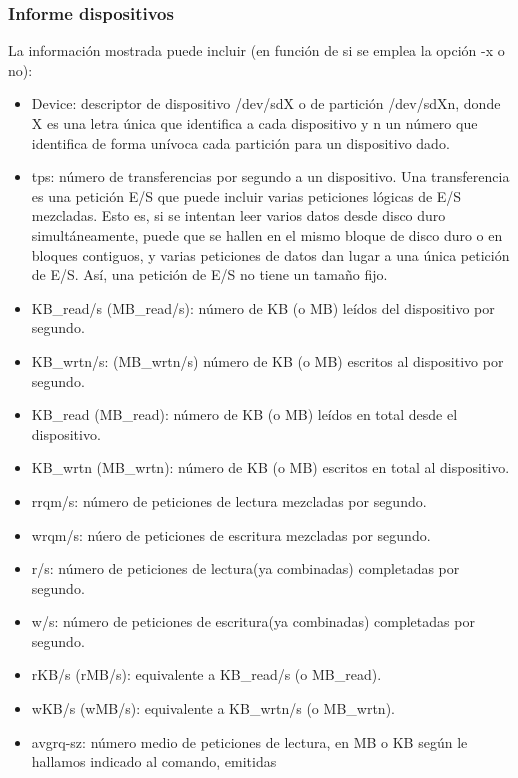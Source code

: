 \documentclass[a4paper,10pt]{article}
\renewcommand{\texttt}[2][black!60]{\textcolor{#1}{\ttfamily #2}}
\begin{document}
\subsubsection{Informe dispositivos}
\label{optdisp}
La información mostrada puede incluir (en función de si se emplea la opción \texttt{-x} o no):
\begin{itemize}
 \item{\texttt{Device}}: descriptor de dispositivo \texttt{/dev/sdX} o de partición \texttt{/dev/sdXn}, donde \texttt{X} es una
 letra única que identifica a cada dispositivo y \texttt{n} un número que identifica de forma unívoca cada partición para un
 dispositivo dado.
 \item{\texttt{tps}}: número de transferencias por segundo a un dispositivo. Una transferencia es una petición E/S que puede
 incluir varias peticiones lógicas de E/S mezcladas. Esto es, si se intentan leer varios datos desde disco duro simultáneamente,
 puede que se hallen en el mismo bloque de disco duro o en bloques contiguos, y varias peticiones de datos dan lugar a una única
 petición de E/S. Así, una petición de E/S no tiene un tamaño fijo.
 \item{\texttt{KB\_read/s} (\texttt{MB\_read/s}}): número de KB (o MB) leídos del dispositivo por segundo.
 \item{\texttt{KB\_wrtn/s}}: (\texttt{MB\_wrtn/s}) número de KB (o MB) escritos al dispositivo por segundo.
 \item{\texttt{KB\_read}} (\texttt{MB\_read}): número de KB (o MB) leídos en total desde el dispositivo.
 \item{\texttt{KB\_wrtn}} (\texttt{MB\_wrtn}): número de KB (o MB) escritos en total al dispositivo.
 \item{\texttt{rrqm/s}}: número de peticiones de lectura mezcladas por segundo.
 \item{\texttt{wrqm/s}}: núero de peticiones de escritura mezcladas por segundo.
 \item{\texttt{r/s}}: número de peticiones de lectura(ya combinadas) completadas por segundo.
 \item{\texttt{w/s}}: número de peticiones de escritura(ya combinadas) completadas por segundo.
 \item{\texttt{rKB/s}} (\texttt{rMB/s}): equivalente a \texttt{KB\_read/s} (o \texttt{MB\_read}).
 \item{\texttt{wKB/s}} (\texttt{wMB/s}): equivalente a \texttt{KB\_wrtn/s} (o \texttt{MB\_wrtn}).
 \item{\texttt{avgrq-sz}}: número medio de peticiones de lectura, en MB o KB según le hallamos indicado al comando, emitidas

\end{itemize}
\end{document}
